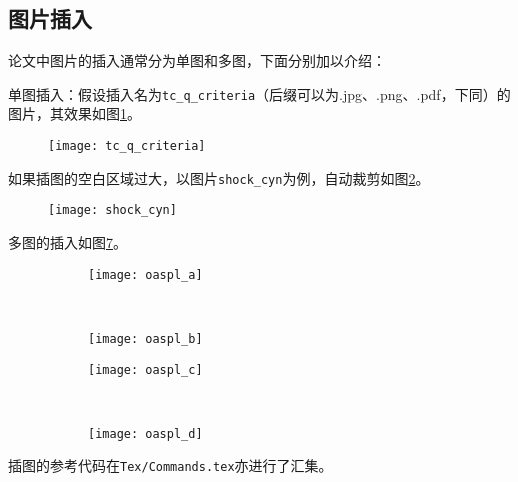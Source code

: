 \subsection{图片插入}

论文中图片的插入通常分为单图和多图，下面分别加以介绍：

单图插入：假设插入名为\verb|tc_q_criteria|（后缀可以为.jpg、.png、.pdf，下同）的图片，其效果如图\ref{fig:tc_q_criteria}。
\begin{figure}[!htbp]
    \centering
    \texttt{[image: tc\_q\_criteria]}
    \label{fig:tc_q_criteria}
\end{figure}

如果插图的空白区域过大，以图片\verb|shock_cyn|为例，自动裁剪如图\ref{fig:shock_cyn}。
\begin{figure}[!htbp]
    \centering
    \texttt{[image: shock\_cyn]}
    \label{fig:shock_cyn}
\end{figure}

多图的插入如图\ref{fig:oaspl}。
\begin{figure}[!htbp]
    \centering
    \begin{subfigure}[b]{0.35\textwidth}
      \texttt{[image: oaspl\_a]}
      \caption{}
      \label{fig:oaspl_a}
    \end{subfigure}%
    ~%
    \begin{subfigure}[b]{0.35\textwidth}
      \texttt{[image: oaspl\_b]}
      \caption{}
      \label{fig:oaspl_b}
    \end{subfigure}
    \begin{subfigure}[b]{0.35\textwidth}
      \texttt{[image: oaspl\_c]}
      \caption{}
      \label{fig:oaspl_c}
    \end{subfigure}%
    ~%
    \begin{subfigure}[b]{0.35\textwidth}
      \texttt{[image: oaspl\_d]}
      \caption{}
      \label{fig:oaspl_d}
    \end{subfigure}
    \label{fig:oaspl}
\end{figure}

插图的参考代码在\verb|Tex/Commands.tex|亦进行了汇集。

